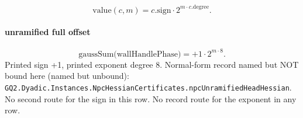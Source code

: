 \[\mathrm{value}(c,m)=c.\mathrm{sign}\cdot 2^{m\cdot c.\mathrm{degree}}.\]
\paragraph{unramified full offset}
\[\mathrm{gaussSum}\bigl(\mathrm{wallHandlePhase}\bigr)=+1\cdot 2^{m\cdot 8}.\]
Printed sign +1, printed exponent degree 8. Normal-form record named but NOT bound here (named but unbound): \texttt{GQ2.Dyadic.Instances.NpcHessianCertificates.npcUnramifiedHeadHessian}.
No second route for the sign in this row. No record route for the exponent in any row.
